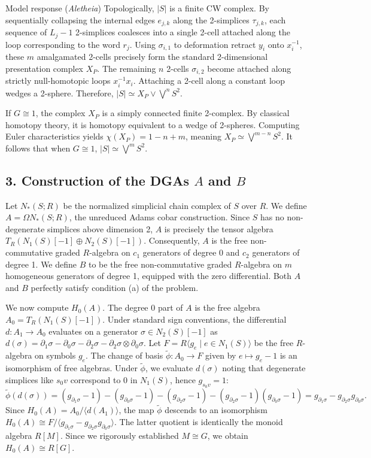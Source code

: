 \documentclass{article}
\theoremstyle{plain}
\theoremstyle{definition}
\begin{document}
\begin{solution}{Model response (\emph{Aletheia})}
Topologically, $|S|$ is a finite CW complex. By sequentially collapsing the internal edges $e_{j,k}$ along the 2-simplices $\tau_{j,k}$, each sequence of $L_j - 1$ 2-simplices coalesces into a single 2-cell attached along the loop corresponding to the word $r_j$. Using $\sigma_{i,1}$ to deformation retract $y_i$ onto $x_i^{-1}$, these $m$ amalgamated 2-cells precisely form the standard 2-dimensional presentation complex $X_P$. The remaining $n$ 2-cells $\sigma_{i,2}$ become attached along strictly null-homotopic loops $x_i^{-1} x_i$. Attaching a 2-cell along a constant loop wedges a 2-sphere. Therefore, $|S| \simeq X_P \vee \bigvee^n S^2$.

If $G \cong 1$, the complex $X_P$ is a simply connected finite 2-complex. By classical homotopy theory, it is homotopy equivalent to a wedge of 2-spheres. Computing Euler characteristics yields $\chi(X_P) = 1 - n + m$, meaning $X_P \simeq \bigvee^{m-n} S^2$. It follows that when $G \cong 1$, $|S| \simeq \bigvee^m S^2$.

\subsection*{3. Construction of the DGAs $A$ and $B$}
Let $N_*(S; R)$ be the normalized simplicial chain complex of $S$ over $R$. We define $A = \Omega N_*(S; R)$, the unreduced Adams cobar construction. Since $S$ has no non-degenerate simplices above dimension 2, $A$ is precisely the tensor algebra $T_R(N_1(S)[-1] \oplus N_2(S)[-1])$. Consequently, $A$ is the free non-commutative graded $R$-algebra on $c_1$ generators of degree 0 and $c_2$ generators of degree 1.
We define $B$ to be the free non-commutative graded $R$-algebra on $m$ homogeneous generators of degree 1, equipped with the zero differential. Both $A$ and $B$ perfectly satisfy condition (a) of the problem.

We now compute $H_0(A)$. The degree 0 part of $A$ is the free algebra $A_0 = T_R(N_1(S)[-1])$. Under standard sign conventions, the differential $d: A_1 \to A_0$ evaluates on a generator $\sigma \in N_2(S)[-1]$ as $d(\sigma) = \partial_1 \sigma - \partial_0 \sigma - \partial_2 \sigma - \partial_2 \sigma \otimes \partial_0 \sigma$. Let $F = R\langle g_e \mid e \in N_1(S) \rangle$ be the free $R$-algebra on symbols $g_e$. The change of basis $\tilde{\phi}: A_0 \to F$ given by $e \mapsto g_e - 1$ is an isomorphism of free algebras. Under $\tilde{\phi}$, we evaluate $d(\sigma)$ noting that degenerate simplices like $s_0v$ correspond to $0$ in $N_1(S)$, hence $g_{s_0v} = 1$:
$$ \tilde{\phi}(d(\sigma)) = (g_{\partial_1 \sigma} - 1) - (g_{\partial_0 \sigma} - 1) - (g_{\partial_2 \sigma} - 1) - (g_{\partial_2 \sigma} - 1)(g_{\partial_0 \sigma} - 1) = g_{\partial_1 \sigma} - g_{\partial_2 \sigma} g_{\partial_0 \sigma}. $$
Since $H_0(A) = A_0 / \langle d(A_1) \rangle$, the map $\tilde{\phi}$ descends to an isomorphism $H_0(A) \cong F / \langle g_{\partial_1 \sigma} - g_{\partial_2 \sigma} g_{\partial_0 \sigma} \rangle$. The latter quotient is identically the monoid algebra $R[M]$. Since we rigorously established $M \cong G$, we obtain $H_0(A) \cong R[G]$.


\end{solution}
\end{document}
